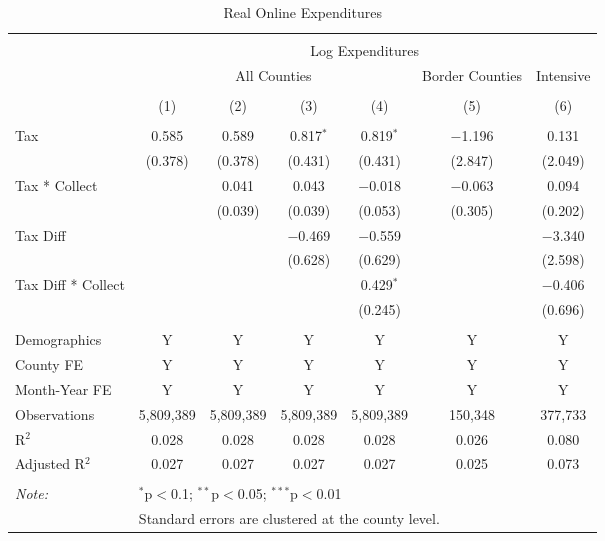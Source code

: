 
\begin{table}[!htbp] \centering 
  \caption{Real Online Expenditures} 
  \label{tab:nielsenOnline} 
\begin{tabular}{@{\extracolsep{5pt}}lcccccc} 
\\[-1.8ex]\hline 
\hline \\[-1.8ex] 
 & \multicolumn{6}{c}{Log Expenditures} \\ 
\cline{2-7} 
 & \multicolumn{4}{c}{All Counties} & Border Counties & Intensive \\ 
\\[-1.8ex] & (1) & (2) & (3) & (4) & (5) & (6)\\ 
\hline \\[-1.8ex] 
 Tax & 0.585 & 0.589 & 0.817$^{*}$ & 0.819$^{*}$ & $-$1.196 & 0.131 \\ 
  & (0.378) & (0.378) & (0.431) & (0.431) & (2.847) & (2.049) \\ 
  Tax * Collect &  & 0.041 & 0.043 & $-$0.018 & $-$0.063 & 0.094 \\ 
  &  & (0.039) & (0.039) & (0.053) & (0.305) & (0.202) \\ 
  Tax Diff &  &  & $-$0.469 & $-$0.559 &  & $-$3.340 \\ 
  &  &  & (0.628) & (0.629) &  & (2.598) \\ 
  Tax Diff * Collect &  &  &  & 0.429$^{*}$ &  & $-$0.406 \\ 
  &  &  &  & (0.245) &  & (0.696) \\ 
 \hline \\[-1.8ex] 
Demographics & Y & Y & Y & Y & Y & Y \\ 
County FE & Y & Y & Y & Y & Y & Y \\ 
Month-Year FE & Y & Y & Y & Y & Y & Y \\ 
Observations & 5,809,389 & 5,809,389 & 5,809,389 & 5,809,389 & 150,348 & 377,733 \\ 
R$^{2}$ & 0.028 & 0.028 & 0.028 & 0.028 & 0.026 & 0.080 \\ 
Adjusted R$^{2}$ & 0.027 & 0.027 & 0.027 & 0.027 & 0.025 & 0.073 \\ 
\hline 
\hline \\[-1.8ex] 
\textit{Note:}  & \multicolumn{6}{l}{$^{*}$p$<$0.1; $^{**}$p$<$0.05; $^{***}$p$<$0.01} \\ 
 & \multicolumn{6}{l}{Standard errors are clustered at the county level.} \\ 
\end{tabular} 
\end{table} 
